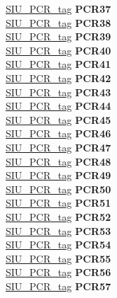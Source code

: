 \begin{DoxyCompactItemize}
\begin{tabbing}
\>\>\mbox{\hyperlink{unionSIU__tag_1_1SIU__PCR__tag}{SIU\_PCR\_tag}} {\bfseries PCR37}\\
\>\>\mbox{\hyperlink{unionSIU__tag_1_1SIU__PCR__tag}{SIU\_PCR\_tag}} {\bfseries PCR38}\\
\>\>\mbox{\hyperlink{unionSIU__tag_1_1SIU__PCR__tag}{SIU\_PCR\_tag}} {\bfseries PCR39}\\
\>\>\mbox{\hyperlink{unionSIU__tag_1_1SIU__PCR__tag}{SIU\_PCR\_tag}} {\bfseries PCR40}\\
\>\>\mbox{\hyperlink{unionSIU__tag_1_1SIU__PCR__tag}{SIU\_PCR\_tag}} {\bfseries PCR41}\\
\>\>\mbox{\hyperlink{unionSIU__tag_1_1SIU__PCR__tag}{SIU\_PCR\_tag}} {\bfseries PCR42}\\
\>\>\mbox{\hyperlink{unionSIU__tag_1_1SIU__PCR__tag}{SIU\_PCR\_tag}} {\bfseries PCR43}\\
\>\>\mbox{\hyperlink{unionSIU__tag_1_1SIU__PCR__tag}{SIU\_PCR\_tag}} {\bfseries PCR44}\\
\>\>\mbox{\hyperlink{unionSIU__tag_1_1SIU__PCR__tag}{SIU\_PCR\_tag}} {\bfseries PCR45}\\
\>\>\mbox{\hyperlink{unionSIU__tag_1_1SIU__PCR__tag}{SIU\_PCR\_tag}} {\bfseries PCR46}\\
\>\>\mbox{\hyperlink{unionSIU__tag_1_1SIU__PCR__tag}{SIU\_PCR\_tag}} {\bfseries PCR47}\\
\>\>\mbox{\hyperlink{unionSIU__tag_1_1SIU__PCR__tag}{SIU\_PCR\_tag}} {\bfseries PCR48}\\
\>\>\mbox{\hyperlink{unionSIU__tag_1_1SIU__PCR__tag}{SIU\_PCR\_tag}} {\bfseries PCR49}\\
\>\>\mbox{\hyperlink{unionSIU__tag_1_1SIU__PCR__tag}{SIU\_PCR\_tag}} {\bfseries PCR50}\\
\>\>\mbox{\hyperlink{unionSIU__tag_1_1SIU__PCR__tag}{SIU\_PCR\_tag}} {\bfseries PCR51}\\
\>\>\mbox{\hyperlink{unionSIU__tag_1_1SIU__PCR__tag}{SIU\_PCR\_tag}} {\bfseries PCR52}\\
\>\>\mbox{\hyperlink{unionSIU__tag_1_1SIU__PCR__tag}{SIU\_PCR\_tag}} {\bfseries PCR53}\\
\>\>\mbox{\hyperlink{unionSIU__tag_1_1SIU__PCR__tag}{SIU\_PCR\_tag}} {\bfseries PCR54}\\
\>\>\mbox{\hyperlink{unionSIU__tag_1_1SIU__PCR__tag}{SIU\_PCR\_tag}} {\bfseries PCR55}\\
\>\>\mbox{\hyperlink{unionSIU__tag_1_1SIU__PCR__tag}{SIU\_PCR\_tag}} {\bfseries PCR56}\\
\>\>\mbox{\hyperlink{unionSIU__tag_1_1SIU__PCR__tag}{SIU\_PCR\_tag}} {\bfseries PCR57}\\

\end{tabbing}
\end{DoxyCompactItemize}
